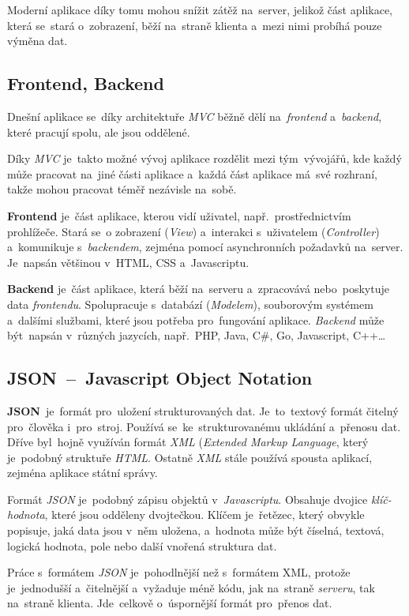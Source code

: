 \documentclass[10pt,a4paper]{article}
\begin{document}
        Moderní aplikace díky tomu mohou snížit zátěž na~server, jelikož část aplikace, která se~stará o~zobrazení, běží na~straně klienta a~mezi nimi probíhá pouze výměna dat.

        \subsection{Frontend, Backend}
        Dnešní aplikace se~díky architektuře \emph{MVC} běžně dělí na~\emph{frontend} a~\emph{backend}, které pracují spolu, ale jsou oddělené.

        Díky \emph{MVC} je~takto možné vývoj aplikace rozdělit mezi tým~vývojářů, kde každý může pracovat na~jiné části aplikace a~každá část aplikace má~své rozhraní, takže mohou pracovat téměř nezávisle na~sobě.

        \textbf{Frontend} je~část aplikace, kterou vidí uživatel, např.~prostřednictvím prohlížeče. Stará se~o zobrazení (\emph{View}) a~interakci s~uživatelem (\emph{Controller}) a~komunikuje s~\emph{backendem}, zejména pomocí asynchronních požadavků na~server. Je~napsán většinou v~HTML, CSS a~Javascriptu.

        \textbf{Backend} je~část aplikace, která běží na~serveru a~zpracovává nebo~poskytuje data \emph{frontendu}. Spolupracuje s~databází (\emph{Modelem}), souborovým systémem a~dalšími službami, které jsou potřeba pro~fungování aplikace. \emph{Backend} může být~napsán v~různých jazycích, např.~PHP, Java, C\#, Go, Javascript, C++\dots

        \subsection{JSON~--~Javascript Object Notation}
        \textbf{JSON}~je~formát pro~uložení strukturovaných dat. Je~to~textový formát čitelný pro~člověka i~pro~stroj. Používá se~ke~strukturovanému ukládání a~přenosu dat. Dříve byl~hojně využíván formát \emph{XML} (\emph{Extended Markup Language}, který je~podobný struktuře \emph{HTML}. Ostatně \emph{XML} stále používá spousta aplikací, zejména aplikace státní správy.

        Formát \emph{JSON} je~podobný zápisu objektů v~\emph{Javascriptu}. Obsahuje dvojice \emph{klíč-hodnota}, které jsou odděleny dvojtečkou. Klíčem je~řetězec, který obvykle popisuje, jaká data jsou v~něm uložena, a~hodnota může být číselná, textová, logická hodnota, pole nebo další vnořená struktura dat.
        
        Práce s~formátem \emph{JSON} je~pohodlnější než s~formátem XML, protože je~jednodušší a~čitelnější a~vyžaduje méně kódu, jak na~straně \emph{serveru}, tak na~straně klienta. Jde~celkově o~úspornější formát pro~přenos dat.
\end{document}
